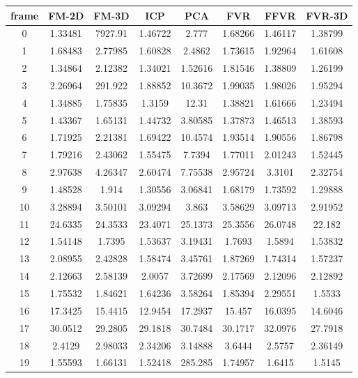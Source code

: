 \begin{figure}
\centering
\begin{tabular}{cccccccc}
\hline
\textbf{frame} & \textbf{FM-2D} & \textbf{FM-3D} & \textbf{ICP} & \textbf{PCA} & \textbf{FVR} & \textbf{FFVR} & \textbf{FVR-3D}
\\ \hline
0 & 1.33481 & 7927.91 & 1.46722 & 2.777 & 1.68266 & 1.46117 & 1.38799\\
1 & 1.68483 & 2.77985 & 1.60828 & 2.4862 & 1.73615 & 1.92964 & 1.61608\\
2 & 1.34864 & 2.12382 & 1.34021 & 1.52616 & 1.81546 & 1.38809 & 1.26199\\
3 & 2.26964 & 291.922 & 1.88852 & 10.3672 & 1.99035 & 1.98026 & 1.95294\\
4 & 1.34885 & 1.75835 & 1.3159 & 12.31 & 1.38821 & 1.61666 & 1.23494\\
5 & 1.43367 & 1.65131 & 1.44732 & 3.80585 & 1.37873 & 1.46513 & 1.38593\\
6 & 1.71925 & 2.21381 & 1.69422 & 10.4574 & 1.93514 & 1.90556 & 1.86798\\
7 & 1.79216 & 2.43062 & 1.55475 & 7.7394 & 1.77011 & 2.01243 & 1.52445\\
8 & 2.97638 & 4.26347 & 2.60474 & 7.75538 & 2.95724 & 3.3101 & 2.32754\\
9 & 1.48528 & 1.914 & 1.30556 & 3.06841 & 1.68179 & 1.73592 & 1.29888\\
10 & 3.28894 & 3.50101 & 3.09294 & 3.863 & 3.58629 & 3.09713 & 2.91952\\
11 & 24.6335 & 24.3533 & 23.4071 & 25.1373 & 25.3556 & 26.0748 & 22.182\\
12 & 1.54148 & 1.7395 & 1.53637 & 3.19431 & 1.7693 & 1.5894 & 1.53832\\
13 & 2.08955 & 2.42828 & 1.58474 & 3.45761 & 1.87269 & 1.74314 & 1.57237\\
14 & 2.12663 & 2.58139 & 2.0057 & 3.72699 & 2.17569 & 2.12096 & 2.12892\\
15 & 1.75532 & 1.84621 & 1.64236 & 3.58264 & 1.85394 & 2.29551 & 1.5533\\
16 & 17.3425 & 15.4415 & 12.9454 & 17.2937 & 15.457 & 16.0395 & 14.6046\\
17 & 30.0512 & 29.2805 & 29.1818 & 30.7484 & 30.1717 & 32.0976 & 27.7918\\
18 & 2.4129 & 2.98033 & 2.34206 & 3.14888 & 3.6444 & 2.5757 & 2.36149\\
19 & 1.55593 & 1.66131 & 1.52418 & 285.285 & 1.74957 & 1.6415 & 1.5145\\

\end{tabular}
\end{figure}
